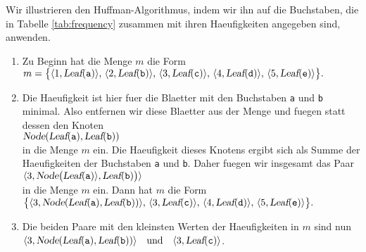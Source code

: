 Wir illustrieren den  Huffman-Algorithmus, indem wir ihn auf die Buchstaben, die in
Tabelle \ref{tab:frequency} zusammen mit ihren Haeufigkeiten angegeben sind, anwenden.
\begin{enumerate}
\item Zu Beginn hat die Menge $m$ die Form
      \\[0.2cm]
      \hspace*{1.3cm}
      $ m = \bigl\{ \langle 1, \textsl{Leaf}(\mathtt{a}) \rangle,\,
             \langle 2, \textsl{Leaf}(\mathtt{b}) \rangle,\, 
             \langle 3, \textsl{Leaf}(\mathtt{c}) \rangle,\,
             \langle 4, \textsl{Leaf}(\mathtt{d}) \rangle,\,
             \langle 5, \textsl{Leaf}(\mathtt{e}) \rangle\bigr\}. $
\item Die Haeufigkeit ist hier fuer die Blaetter mit den Buchstaben \texttt{a} und
      \texttt{b} minimal.  Also entfernen wir diese Blaetter aus der Menge und fuegen statt
      dessen den Knoten 
      \\[0.2cm]
      \hspace*{1.3cm}
      $\textsl{Node}(\textsl{Leaf}(\mathtt{a}), \textsl{Leaf}(\mathtt{b}))$
      \\[0.2cm]
      in die Menge $m$ ein.  Die Haeufigkeit dieses Knotens ergibt sich als Summe der Haeufigkeiten
      der Buchstaben \texttt{a} und \texttt{b}. Daher fuegen wir insgesamt das Paar
      \\[0.2cm]
      \hspace*{1.3cm}
      $\langle 3, \textsl{Node}\bigl(\textsl{Leaf}(\mathtt{a}) \rangle, \textsl{Leaf}(\mathtt{b}) \bigr) \rangle$
      \\[0.2cm]
      in die Menge $m$ ein.        Dann hat $m$ die Form
      \\[0.2cm]
      \hspace*{1.3cm}
      $ \bigl\{\langle 3, \textsl{Node}(\textsl{Leaf}(\mathtt{a}), \textsl{Leaf}(\mathtt{b}))\rangle,\,
             \langle 3, \textsl{Leaf}(\mathtt{c}) \rangle,\, \langle 4, \textsl{Leaf}(\mathtt{d}) \rangle,\,
             \langle 5, \textsl{Leaf}(\mathtt{e}) \rangle\bigr\}. $
\item Die beiden Paare mit den kleinsten Werten der Haeufigkeiten in $m$ sind nun
      \\[0.2cm]
      \hspace*{1.3cm}
      $ \langle 3, \textsl{Node}(\textsl{Leaf}(\mathtt{a}), \textsl{Leaf}(\mathtt{b})) \rangle
         \quad \mathrm{und} \quad \langle 3, \textsl{Leaf}(\mathtt{c})\rangle$.
      \\[0.2cm]

\end{enumerate}
